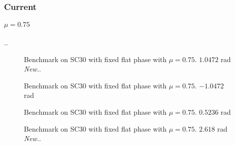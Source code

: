 \documentclass[../main.tex]{subfiles}
\begin{document}
\subsubsection{Current}
 \paragraph{$\mu = 0.75$}..
 \begin{figure}[H]
    \centering
    
    \caption{Benchmark on SC30 with fixed flat phase with $\mu = 0.75$. $1.0472$ rad  \color{red} \textit{New.}\color{black}.}
    \label{fig:sc30_fixed_flat_phase}
\end{figure}
\begin{figure}[H]
    \centering
    
    \caption{Benchmark on SC30 with fixed flat phase with $\mu = 0.75$. $-1.0472$ rad}
    \label{fig:sc30_fixed_flat_phase}
\end{figure}
\begin{figure}[H]
    \centering
    
    \caption{Benchmark on SC30 with fixed flat phase with $\mu = 0.75$. $0.5236$ rad}
    \label{fig:sc30_fixed_flat_phase}
\end{figure}
\begin{figure}[H]
    \centering
    
    \caption{Benchmark on SC30 with fixed flat phase with $\mu = 0.75$. $2.618$ rad \color{red} \textit{New.}\color{black}.}
    \label{fig:sc30_fixed_flat_phase}
\end{figure}
\end{document}

